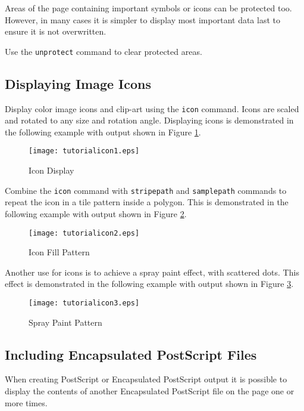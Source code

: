 Areas of the page containing important symbols or icons can be
protected too.  However, in many cases it is simpler to
display most important data last to ensure it is not overwritten.

Use the \texttt{unprotect} command to clear protected areas.

\subsection{Displaying Image Icons}
\label{icons}

Display color image icons and clip-art using the \texttt{icon} command.
Icons are scaled and rotated to any size and rotation angle.
Displaying icons is demonstrated in the following example
with output shown in Figure \ref{tutorialicon1}.



\begin{figure}[htb]
\texttt{[image: tutorialicon1.eps]}
\caption{Icon Display}
\label{tutorialicon1}
\end{figure}

Combine the \texttt{icon} command with
\texttt{stripepath} and
\texttt{samplepath} commands to
repeat the icon in a tile pattern inside a polygon.
This is demonstrated in the following example
with output shown in Figure \ref{tutorialicon2}.



\begin{figure}[htb]
\texttt{[image: tutorialicon2.eps]}
\caption{Icon Fill Pattern}
\label{tutorialicon2}
\end{figure}

Another use for icons is to achieve a spray paint effect,
with scattered dots.
This effect is demonstrated in the following example
with output shown in Figure \ref{tutorialicon3}.



\begin{figure}[htb]
\texttt{[image: tutorialicon3.eps]}
\caption{Spray Paint Pattern}
\label{tutorialicon3}
\end{figure}

\subsection{Including Encapsulated PostScript Files}

When creating PostScript or Encapsulated PostScript output it 
is possible to display the contents of another Encapsulated PostScript
file on the page one or more times.


